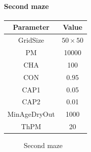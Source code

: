 \paragraph{Second maze}

\begin{center}
 \begin{tabular}{||c c||} 
 \hline
 Parameter & Value \\ [0.5ex] 
 \hline\hline
 GridSize & $50 \times 50$ \\ 
 \hline
 PM & 10000 \\ 
 \hline
 CHA & 100 \\ 
 \hline
 CON & 0.95 \\ 
 \hline
 CAP1 & 0.05 \\ 
 \hline
 CAP2 & 0.01 \\ 
 \hline
 MinAgeDryOut & 1000 \\
 \hline
 ThPM & 20 \\ [1ex] 
 \hline
 \end{tabular}
\end{center}

\begin{figure}[H]
    \centering
    \caption{Second maze}
    \label{fig:foobar}
\end{figure}
